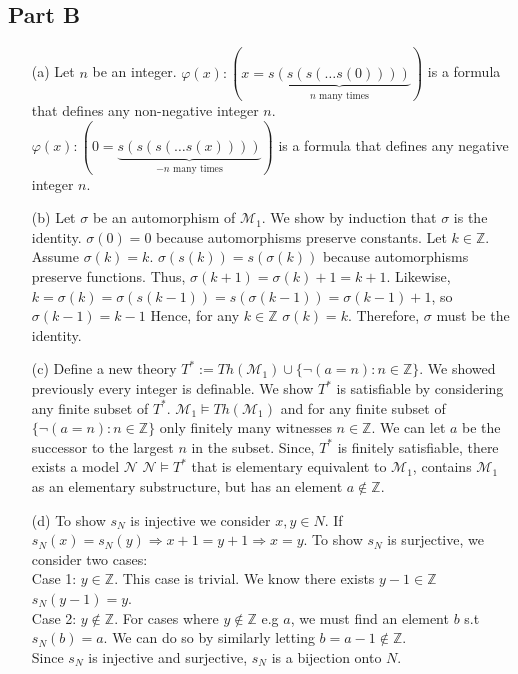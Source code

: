 \documentclass[10pt]{article}
\begin{document}
\subsection*{Part B}
\begin{itemize}
    \item [(a)] Let $n$ be an integer. 
    $\varphi(x):(x=\underbrace{s(s(s(\ldots s(0))))}_{n\text{ many times}})$ is a formula that defines any non-negative integer $n$.
    $\varphi(x):(0=\underbrace{s(s(s(\ldots s(x))))}_{-n\text{ many times}})$ is a formula that defines any negative integer $n$.
    \item [(b)] Let $\sigma$ be an automorphism of $\mathcal{M}_1$.
    We show by induction that $\sigma$ is the identity.
    $\sigma(0)=0$ because automorphisms preserve constants.
    Let $k\in \mathbb{Z}$. 
    Assume $\sigma(k)=k$. 
    $\sigma(s(k))=s(\sigma(k))$ because automorphisms preserve functions.
    Thus, $\sigma(k+1)=\sigma(k)+1=k+1$.
    Likewise, $k=\sigma(k)=\sigma(s(k-1))=s(\sigma(k-1))=\sigma(k-1)+1$, so $\sigma(k-1)=k-1$
    Hence, for any $k\in\mathbb{Z}$ $\sigma(k)=k$. Therefore, $\sigma$ must be the identity.
    \item[(c)] Define a new theory $T^*:=Th(\mathcal{M}_1)\cup\{\lnot(a=n):n\in\mathbb{Z}\}$. We showed previously every integer is definable.
    We show $T^*$ is satisfiable by considering any finite subset of $T^*$. 
    $\mathcal{M}_1\models Th(\mathcal{M}_1)$ and for any finite subset of $\{\lnot(a=n):n\in\mathbb{Z}\}$ only finitely many witnesses $n\in\mathbb{Z}$. 
    We can let $a$ be the successor to the largest $n$ in the subset. 
    Since, $T^*$ is finitely satisfiable, there exists a model $\mathcal{N}$ $\mathcal{N}\models T^*$ that is elementary equivalent to $\mathcal{M}_1$, contains $\mathcal{M}_1$ as an elementary substructure, but has an element $a\not\in\mathbb{Z}$.
    \item [(d)] To show $s_N$ is injective we consider $x,y\in N$. If $s_N(x)=s_N(y)\Rightarrow x+1=y+1\Rightarrow x=y$.
    To show $s_N$ is surjective, we consider two cases:\\
    Case 1: $y\in\mathbb{Z}$. This case is trivial. We know there exists $y-1\in\mathbb{Z}$ $s_N(y-1)=y$.\\
    Case 2: $y\not\in\mathbb{Z}$. For cases where $y\not\in\mathbb{Z}$ e.g $a$, we must find an element $b$ s.t $s_N(b)=a$. We can do so by similarly letting $b=a-1\not\in\mathbb{Z}$.\\
    Since $s_N$ is injective and surjective, $s_N$ is a bijection onto $N$.   
\end{itemize}
\end{document}
